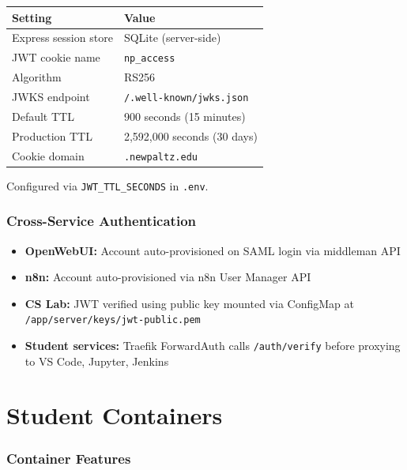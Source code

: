 \documentclass[11pt,a4paper]{article}
\begin{document}
\begin{table}[H]
\centering
\begin{tabular}{ll}
\toprule
\textbf{Setting} & \textbf{Value} \\
\midrule
Express session store & SQLite (server-side) \\
JWT cookie name & \texttt{np\_access} \\
Algorithm & RS256 \\
JWKS endpoint & \texttt{/.well-known/jwks.json} \\
Default TTL & 900 seconds (15 minutes) \\
Production TTL & 2,592,000 seconds (30 days) \\
Cookie domain & \texttt{.newpaltz.edu} \\
\bottomrule
\end{tabular}
\end{table}

Configured via \texttt{JWT\_TTL\_SECONDS} in \texttt{.env}.

\section{Cross-Service Authentication}

\begin{itemize}[nosep]
    \item \textbf{OpenWebUI:} Account auto-provisioned on SAML login via middleman API
    \item \textbf{n8n:} Account auto-provisioned via n8n User Manager API
    \item \textbf{CS Lab:} JWT verified using public key mounted via ConfigMap at \texttt{/app/server/keys/jwt-public.pem}
    \item \textbf{Student services:} Traefik ForwardAuth calls \texttt{/auth/verify} before proxying to VS Code, Jupyter, Jenkins
\end{itemize}

\newpage
\part{Student Containers}

\section{Container Features}
\end{document}
